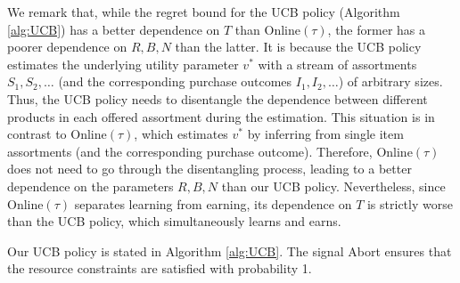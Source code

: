 \documentclass{article}
\theoremstyle{definition}
\newcommand{\SSS}{\mathcal{S}}
\begin{document}
We remark that, while the regret bound for the UCB policy (Algorithm \ref{alg:UCB}) has a better dependence on $T$ than {\sc Online}$(\tau)$, the former has a poorer dependence on $R, B, N$ than the latter. It is because the UCB policy estimates the underlying utility parameter $v^*$ with a stream of assortments $S_1, S_2, \ldots$ (and the corresponding purchase outcomes $I_1, I_2, \ldots$) of arbitrary sizes. Thus, the UCB policy needs to disentangle the dependence between different products in each offered assortment during the estimation. This situation is in contrast to {\sc Online}$(\tau)$, which estimates $v^*$ by inferring from single item assortments (and the corresponding purchase outcome). Therefore, {\sc Online}$(\tau)$ does not need to go through the disentangling process, leading to a better dependence on the parameters $R, B, N$ than our UCB policy. Nevertheless, since {\sc Online}$(\tau)$ separates learning from earning, its dependence on $T$ is strictly worse than the UCB policy, which simultaneously learns and earns.


Our UCB policy is stated in Algorithm \ref{alg:UCB}. The signal {\sc Abort} ensures that the resource constraints are satisfied with probability 1. 
\end{document}
